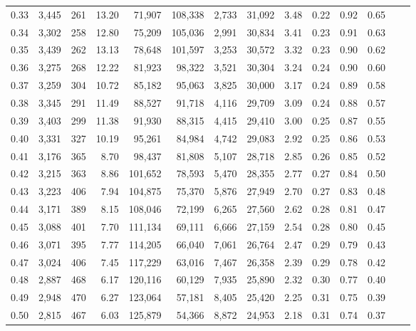 \begin{tabular}{rrrrrrrrrrrrrr}
0.33 &  3,445 &  261 &   13.20 &   71,907 &  108,338 &   2,733 &  31,092 &  3.48 &  0.22 &  0.92 &      0.65 \\
0.34 &  3,302 &  258 &   12.80 &   75,209 &  105,036 &   2,991 &  30,834 &  3.41 &  0.23 &  0.91 &      0.63 \\
0.35 &  3,439 &  262 &   13.13 &   78,648 &  101,597 &   3,253 &  30,572 &  3.32 &  0.23 &  0.90 &      0.62 \\
0.36 &  3,275 &  268 &   12.22 &   81,923 &   98,322 &   3,521 &  30,304 &  3.24 &  0.24 &  0.90 &      0.60 \\
0.37 &  3,259 &  304 &   10.72 &   85,182 &   95,063 &   3,825 &  30,000 &  3.17 &  0.24 &  0.89 &      0.58 \\
0.38 &  3,345 &  291 &   11.49 &   88,527 &   91,718 &   4,116 &  29,709 &  3.09 &  0.24 &  0.88 &      0.57 \\
0.39 &  3,403 &  299 &   11.38 &   91,930 &   88,315 &   4,415 &  29,410 &  3.00 &  0.25 &  0.87 &      0.55 \\
0.40 &  3,331 &  327 &   10.19 &   95,261 &   84,984 &   4,742 &  29,083 &  2.92 &  0.25 &  0.86 &      0.53 \\
0.41 &  3,176 &  365 &    8.70 &   98,437 &   81,808 &   5,107 &  28,718 &  2.85 &  0.26 &  0.85 &      0.52 \\
0.42 &  3,215 &  363 &    8.86 &  101,652 &   78,593 &   5,470 &  28,355 &  2.77 &  0.27 &  0.84 &      0.50 \\
0.43 &  3,223 &  406 &    7.94 &  104,875 &   75,370 &   5,876 &  27,949 &  2.70 &  0.27 &  0.83 &      0.48 \\
0.44 &  3,171 &  389 &    8.15 &  108,046 &   72,199 &   6,265 &  27,560 &  2.62 &  0.28 &  0.81 &      0.47 \\
0.45 &  3,088 &  401 &    7.70 &  111,134 &   69,111 &   6,666 &  27,159 &  2.54 &  0.28 &  0.80 &      0.45 \\
0.46 &  3,071 &  395 &    7.77 &  114,205 &   66,040 &   7,061 &  26,764 &  2.47 &  0.29 &  0.79 &      0.43 \\
0.47 &  3,024 &  406 &    7.45 &  117,229 &   63,016 &   7,467 &  26,358 &  2.39 &  0.29 &  0.78 &      0.42 \\
0.48 &  2,887 &  468 &    6.17 &  120,116 &   60,129 &   7,935 &  25,890 &  2.32 &  0.30 &  0.77 &      0.40 \\
0.49 &  2,948 &  470 &    6.27 &  123,064 &   57,181 &   8,405 &  25,420 &  2.25 &  0.31 &  0.75 &      0.39 \\
0.50 &  2,815 &  467 &    6.03 &  125,879 &   54,366 &   8,872 &  24,953 &  2.18 &  0.31 &  0.74 &      0.37 \\

\end{tabular}
